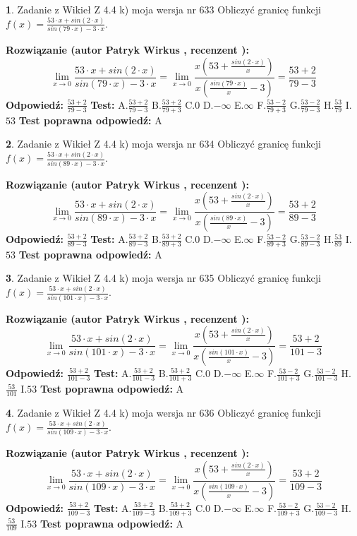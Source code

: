 \documentclass[12pt, a4paper]{article}
\theoremstyle{definition} %
\newtheorem{zad}{}
\newcommand{\zadStart}[1]{\begin{zad}#1\newline}
\newcommand{\zadStop}{\end{zad}}
\newcommand{\rozwStart}[2]{\noindent \textbf{Rozwiązanie (autor #1 , recenzent #2): }\newline}
\newcommand{\rozwStop}{\newline}
\newcommand{\odpStart}{\noindent \textbf{Odpowiedź:}\newline}
\newcommand{\odpStop}{\newline}
\newcommand{\testStart}{\noindent \textbf{Test:}\newline}
\newcommand{\testStop}{\newline}
\newcommand{\kluczStart}{\noindent \textbf{Test poprawna odpowiedź:}\newline}
\newcommand{\kluczStop}{\newline}
\begin{document}
\zadStart{Zadanie z Wikieł Z 4.4 k) moja wersja nr 633}
Obliczyć granicę funkcji $f(x)=\frac{53\cdot x +sin(2\cdot x)}{sin(79\cdot x) -3\cdot x}$.
\zadStop
\rozwStart{Patryk Wirkus}{}
$$\lim\limits_{x\to 0}\frac{53\cdot x +sin(2\cdot x)}{sin(79\cdot x) -3\cdot x}
=\lim\limits_{x\to 0}\frac{x(53+\frac{sin(2\cdot x)}{x})}{x(\frac{sin(79\cdot x)}{x}-3)}
=\frac{53+2}{79-3}$$
\rozwStop
\odpStart
$\frac{53+2}{79-3}$
\odpStop
\testStart
A.$\frac{53+2}{79-3}$
B.$\frac{53+2}{79+3}$
C.$0$
D.$-\infty$
E.$\infty$
F.$\frac{53-2}{79+3}$
G.$\frac{53-2}{79-3}$
H.$\frac{53}{79}$
I.$53$
\testStop
\kluczStart
A
\kluczStop



\zadStart{Zadanie z Wikieł Z 4.4 k) moja wersja nr 634}
Obliczyć granicę funkcji $f(x)=\frac{53\cdot x +sin(2\cdot x)}{sin(89\cdot x) -3\cdot x}$.
\zadStop
\rozwStart{Patryk Wirkus}{}
$$\lim\limits_{x\to 0}\frac{53\cdot x +sin(2\cdot x)}{sin(89\cdot x) -3\cdot x}
=\lim\limits_{x\to 0}\frac{x(53+\frac{sin(2\cdot x)}{x})}{x(\frac{sin(89\cdot x)}{x}-3)}
=\frac{53+2}{89-3}$$
\rozwStop
\odpStart
$\frac{53+2}{89-3}$
\odpStop
\testStart
A.$\frac{53+2}{89-3}$
B.$\frac{53+2}{89+3}$
C.$0$
D.$-\infty$
E.$\infty$
F.$\frac{53-2}{89+3}$
G.$\frac{53-2}{89-3}$
H.$\frac{53}{89}$
I.$53$
\testStop
\kluczStart
A
\kluczStop



\zadStart{Zadanie z Wikieł Z 4.4 k) moja wersja nr 635}
Obliczyć granicę funkcji $f(x)=\frac{53\cdot x +sin(2\cdot x)}{sin(101\cdot x) -3\cdot x}$.
\zadStop
\rozwStart{Patryk Wirkus}{}
$$\lim\limits_{x\to 0}\frac{53\cdot x +sin(2\cdot x)}{sin(101\cdot x) -3\cdot x}
=\lim\limits_{x\to 0}\frac{x(53+\frac{sin(2\cdot x)}{x})}{x(\frac{sin(101\cdot x)}{x}-3)}
=\frac{53+2}{101-3}$$
\rozwStop
\odpStart
$\frac{53+2}{101-3}$
\odpStop
\testStart
A.$\frac{53+2}{101-3}$
B.$\frac{53+2}{101+3}$
C.$0$
D.$-\infty$
E.$\infty$
F.$\frac{53-2}{101+3}$
G.$\frac{53-2}{101-3}$
H.$\frac{53}{101}$
I.$53$
\testStop
\kluczStart
A
\kluczStop



\zadStart{Zadanie z Wikieł Z 4.4 k) moja wersja nr 636}
Obliczyć granicę funkcji $f(x)=\frac{53\cdot x +sin(2\cdot x)}{sin(109\cdot x) -3\cdot x}$.
\zadStop
\rozwStart{Patryk Wirkus}{}
$$\lim\limits_{x\to 0}\frac{53\cdot x +sin(2\cdot x)}{sin(109\cdot x) -3\cdot x}
=\lim\limits_{x\to 0}\frac{x(53+\frac{sin(2\cdot x)}{x})}{x(\frac{sin(109\cdot x)}{x}-3)}
=\frac{53+2}{109-3}$$
\rozwStop
\odpStart
$\frac{53+2}{109-3}$
\odpStop
\testStart
A.$\frac{53+2}{109-3}$
B.$\frac{53+2}{109+3}$
C.$0$
D.$-\infty$
E.$\infty$
F.$\frac{53-2}{109+3}$
G.$\frac{53-2}{109-3}$
H.$\frac{53}{109}$
I.$53$
\testStop
\kluczStart
A
\kluczStop
\end{document}
